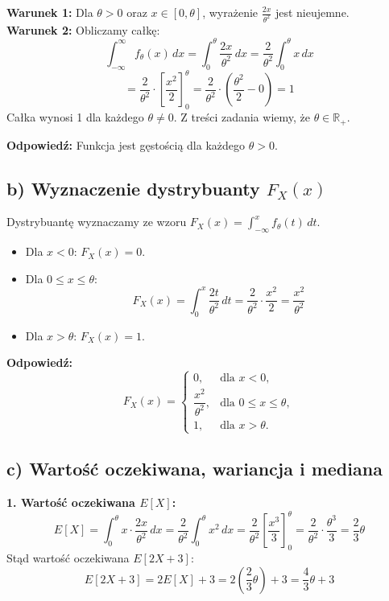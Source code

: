 \documentclass[polish, 10pt]{extarticle}
\theoremstyle{definition}
\begin{document}
\noindent \textbf{Warunek 1:} Dla $\theta > 0$ oraz $x \in [0, \theta]$, wyrażenie $\frac{2x}{\theta^2}$ jest nieujemne. \\
\textbf{Warunek 2:} Obliczamy całkę:
\[
\int_{-\infty}^{\infty} f_\theta(x) \, dx = \int_0^\theta \frac{2x}{\theta^2} \, dx = \frac{2}{\theta^2} \int_0^\theta x \, dx
\]
\[
= \frac{2}{\theta^2} \cdot \left[ \frac{x^2}{2} \right]_0^\theta = \frac{2}{\theta^2} \cdot \left( \frac{\theta^2}{2} - 0 \right) = 1
\]
Całka wynosi 1 dla każdego $\theta \neq 0$. Z treści zadania wiemy, że $\theta \in \mathbb{R}_+$.

\noindent \textbf{Odpowiedź:} Funkcja jest gęstością dla każdego $\theta > 0$.

\subsection*{b) Wyznaczenie dystrybuanty $F_X(x)$}
Dystrybuantę wyznaczamy ze wzoru $F_X(x) = \int_{-\infty}^x f_\theta(t) \, dt$.

\begin{itemize}
    \item Dla $x < 0$: $F_X(x) = 0$.
    \item Dla $0 \leq x \leq \theta$:
    \[
    F_X(x) = \int_0^x \frac{2t}{\theta^2} \, dt = \frac{2}{\theta^2} \cdot \frac{x^2}{2} = \frac{x^2}{\theta^2}
    \]
    \item Dla $x > \theta$: $F_X(x) = 1$.
\end{itemize}

\noindent \textbf{Odpowiedź:}
\[
F_X(x) =
\begin{cases}
0, & \text{dla } x < 0, \\[6pt]
\dfrac{x^2}{\theta^2}, & \text{dla } 0 \leq x \leq \theta, \\[6pt]
1, & \text{dla } x > \theta.
\end{cases}
\]

\subsection*{c) Wartość oczekiwana, wariancja i mediana}

\textbf{1. Wartość oczekiwana $E[X]$:}
\[
E[X] = \int_0^\theta x \cdot \frac{2x}{\theta^2} \, dx = \frac{2}{\theta^2} \int_0^\theta x^2 \, dx = \frac{2}{\theta^2} \left[ \frac{x^3}{3} \right]_0^\theta = \frac{2}{\theta^2} \cdot \frac{\theta^3}{3} = \frac{2}{3}\theta
\]
Stąd wartość oczekiwana $E[2X+3]$:
\[
E[2X+3] = 2E[X] + 3 = 2\left(\frac{2}{3}\theta\right) + 3 = \frac{4}{3}\theta + 3
\]
\end{document}
